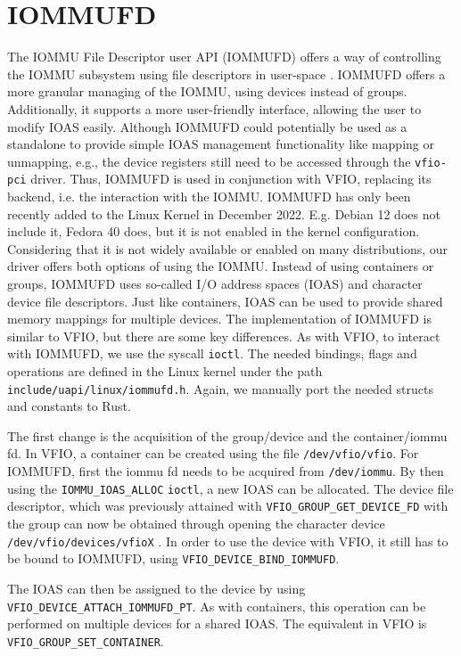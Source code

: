\section{IOMMUFD}
The IOMMU File Descriptor user API (IOMMUFD) offers a way of controlling the IOMMU subsystem using file descriptors in user-space \cite{iommufdkerneldocs}. IOMMUFD offers a more granular managing of the IOMMU, using devices instead of groups. Additionally, it supports a more user-friendly interface, allowing the user to modify IOAS easily. Although IOMMUFD could potentially be used as a standalone to provide simple IOAS management functionality like mapping or unmapping, e.g., the device registers still need to be accessed through the \texttt{vfio-pci} driver. Thus, IOMMUFD is used in conjunction with VFIO, replacing its backend, i.e. the interaction with the IOMMU.
IOMMUFD has only been recently added to the Linux Kernel in December 2022. E.g. Debian 12 does not include it, Fedora 40 does, but it is not enabled in the kernel configuration. Considering that it is not widely available or enabled on many distributions, our driver offers both options of using the IOMMU.
Instead of using containers or groups, IOMMUFD uses so-called I/O address spaces (IOAS) and character device file descriptors. Just like containers, IOAS can be used to provide shared memory mappings for multiple devices. The implementation of IOMMUFD is similar to VFIO, but there are some key differences.
As with VFIO, to interact with IOMMUFD, we use the syscall \texttt{ioctl}. The needed bindings, flags and operations are defined in the Linux kernel under the path \texttt{include/uapi/linux/iommufd.h}. Again, we manually port the needed structs and constants to Rust.

The first change is the acquisition of the group/device and the container/iommu fd.
In VFIO, a container can be created using the file \texttt{/dev/vfio/vfio}. For IOMMUFD, first the iommu fd needs to be acquired from \texttt{/dev/iommu}. By then using the \texttt{IOMMU\_IOAS\_ALLOC} \texttt{ioctl}, a new IOAS can be allocated.
The device file descriptor, which was previously attained with \texttt{VFIO\_GROUP\_GET\_DEVICE\_FD} with the group can now be obtained through opening the character device \texttt{/dev/vfio/devices/vfioX} \cite{vfiokerneldocs}. In order to use the device with VFIO, it still has to be bound to IOMMUFD, using \texttt{VFIO\_DEVICE\_BIND\_IOMMUFD}.

The IOAS can then be assigned to the device by using \texttt{VFIO\_DEVICE\_ATTACH\_IOMMUFD\_PT}. As with containers, this operation can be performed on multiple devices for a shared IOAS. The equivalent in VFIO is \texttt{VFIO\_GROUP\_SET\_CONTAINER}.

